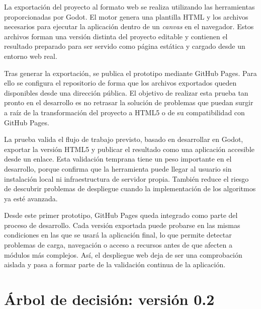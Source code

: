 La exportación del proyecto al formato web se realiza utilizando las herramientas proporcionadas por Godot.
El motor genera una plantilla HTML y los archivos necesarios para ejecutar la aplicación dentro de un \textit{canvas} en el navegador.
Estos archivos forman una versión distinta del proyecto editable y contienen el resultado preparado para ser servido como página estática y cargado desde un entorno web real.

Tras generar la exportación, se publica el prototipo mediante GitHub Pages.
Para ello se configura el repositorio de forma que los archivos exportados queden disponibles desde una dirección pública.
El objetivo de realizar esta prueba tan pronto en el desarrollo es no retrasar la solución de problemas que puedan surgir a raíz de la transformación del proyecto a HTML5 o de su compatibilidad con GitHub Pages.

La prueba valida el flujo de trabajo previsto, basado en desarrollar en Godot, exportar la versión HTML5 y publicar el resultado como una aplicación accesible desde un enlace.
Esta validación temprana tiene un peso importante en el desarrollo, porque confirma que la herramienta puede llegar al usuario sin instalación local ni infraestructura de servidor propia.
También reduce el riesgo de descubrir problemas de despliegue cuando la implementación de los algoritmos ya esté avanzada.

Desde este primer prototipo, GitHub Pages queda integrado como parte del proceso de desarrollo.
Cada versión exportada puede probarse en las mismas condiciones en las que se usará la aplicación final, lo que permite detectar problemas de carga, navegación o acceso a recursos antes de que afecten a módulos más complejos.
Así, el despliegue web deja de ser una comprobación aislada y pasa a formar parte de la validación continua de la aplicación.


\section{Árbol de decisión: versión 0.2}


